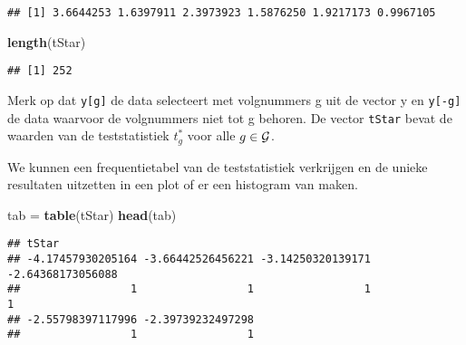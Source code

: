 \documentclass[12pt,dutch,coursenotes]{book}
\newenvironment{Shaded}{\begin{snugshade}}{\end{snugshade}}
\newcommand{\KeywordTok}[1]{\textcolor[rgb]{0.13,0.29,0.53}{\textbf{#1}}}
\newcommand{\StringTok}[1]{\textcolor[rgb]{0.31,0.60,0.02}{#1}}
\newcommand{\NormalTok}[1]{#1}
\theoremstyle{definition}
\theoremstyle{definition}
\theoremstyle{definition}
\theoremstyle{remark}
\begin{document}
\begin{verbatim}
## [1] 3.6644253 1.6397911 2.3973923 1.5876250 1.9217173 0.9967105
\end{verbatim}

\begin{Shaded}
\begin{Highlighting}[]
\KeywordTok{length}\NormalTok{(tStar)}
\end{Highlighting}
\end{Shaded}

\begin{verbatim}
## [1] 252
\end{verbatim}

Merk op dat \texttt{y{[}g{]}} de data selecteert met volgnummers g uit
de vector y en \texttt{y{[}-g{]}} de data waarvoor de volgnummers niet
tot g behoren. De vector \texttt{tStar} bevat de waarden van de
teststatistiek \(t^*_g\) voor alle \(g \in {\cal{G}}\).

We kunnen een frequentietabel van de teststatistiek verkrijgen en de
unieke resultaten uitzetten in een plot of er een histogram van maken.

\begin{Shaded}
\begin{Highlighting}[]
\NormalTok{tab =}\StringTok{ }\KeywordTok{table}\NormalTok{(tStar)}
\KeywordTok{head}\NormalTok{(tab)}
\end{Highlighting}
\end{Shaded}

\begin{verbatim}
## tStar
## -4.17457930205164 -3.66442526456221 -3.14250320139171 -2.64368173056088 
##                 1                 1                 1                 1 
## -2.55798397117996 -2.39739232497298 
##                 1                 1
\end{verbatim}
\end{document}
